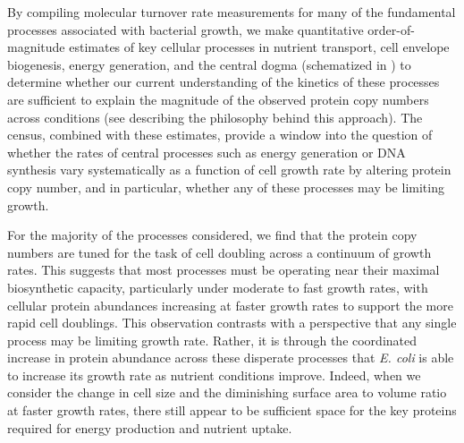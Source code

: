 By compiling molecular turnover rate measurements for many of the
fundamental processes associated with bacterial growth, we make quantitative
order-of-magnitude estimates of key cellular processes in nutrient transport,
cell envelope biogenesis, energy generation, and the central dogma (schematized
in ) to determine whether our current understanding of the
kinetics of these processes are sufficient to explain the magnitude of the
observed protein copy numbers across conditions (see 
describing the philosophy behind this approach). The census, combined with these
estimates, provide a window into the question of whether the rates of central
processes such as energy generation or DNA synthesis vary systematically as a
function of cell growth rate by altering protein copy number, and in particular,
whether any of these processes may be limiting growth.

For the majority of the processes considered, we find that the protein copy
numbers are tuned for the task of cell doubling across a continuum of growth
rates. This suggests that most processes must be operating near their maximal
biosynthetic capacity, particularly under moderate to fast growth rates,  with
cellular protein abundances increasing at faster growth rates to support the
more rapid cell doublings. This observation contrasts with a perspective that
any single process may be limiting growth rate. Rather, it
is through the coordinated increase in protein abundance across these disperate
processes that \textit{E. coli} is able to increase its growth rate as nutrient
conditions improve. Indeed, when we consider the change in cell size and  the
diminishing  surface area to volume ratio at faster growth rates, there still
appear to be sufficient space  for the key proteins required for energy
production  and nutrient uptake.

